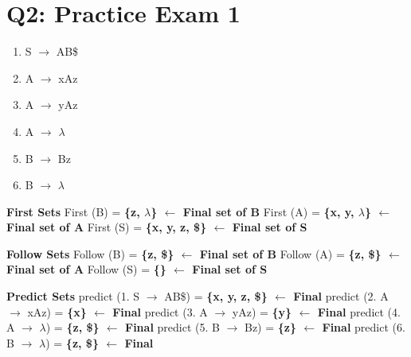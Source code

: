 \documentclass{report}
\begin{document}
\section{Q2: Practice Exam 1}
\vspace{-1em}
\begin{multicols}{2}
      \begin{enumerate}[label=\arabic*.]
        \item S $\rightarrow$ AB\$
        \item A $\rightarrow$ xAz
        \item A $\rightarrow$ yAz
        \item A $\rightarrow$ $\lambda$
        \item B $\rightarrow$ Bz
        \item B $\rightarrow$ $\lambda$
      \end{enumerate}
\setlength{\leftskip}{-12em}
      \textbf{First Sets}\newline
      First (B) = \textbf{\{z, $\lambda$\} $\leftarrow$ Final set of B}\newline
      First (A) = \textbf{\{x, y, $\lambda$\} $\leftarrow$ Final set of A}\newline
      First (S) = \textbf{\{x, y, z, \$\} $\leftarrow$ Final set of S}\newline
\end{multicols}
\begin{multicols}{2}
\noindent\textbf{Follow Sets}\newline
    Follow (B) = \textbf{ \{z, \$\} $\leftarrow$ Final set of B}\newline
    Follow (A) = \textbf{ \{z, \$\} $\leftarrow$ Final set of A}\newline
    Follow (S) =  \textbf{ \{\} $\leftarrow$ Final set of S}\newline\newline\newline\newline

\noindent\textbf{Predict Sets}\newline
    predict (1. S $\rightarrow$ AB\$) = \textbf{ \{x, y, z, \$\} $\leftarrow$ Final}\newline
    predict (2. A $\rightarrow$ xAz) = \textbf{ \{x\} $\leftarrow$ Final}\newline
    predict (3. A $\rightarrow$ yAz) = \textbf{ \{y\} $\leftarrow$ Final}\newline
    predict (4. A $\rightarrow$ $\lambda$) = \textbf{ \{z, \$\} $\leftarrow$ Final}\newline
    predict (5. B $\rightarrow$ Bz) = \textbf{ \{z\} $\leftarrow$ Final}\newline
    predict (6. B $\rightarrow$ $\lambda$) = \textbf{ \{z, \$\} $\leftarrow$ Final}\newline
\end{multicols}
\end{document}
